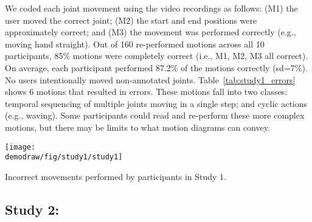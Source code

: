 We coded each joint movement using the video recordings as follows: (M1) the user moved the correct joint; (M2) the start and end positions were approximately correct; %
 and (M3) the movement was performed correctly (e.g., moving hand straight).
%
Out of 160 re-performed motions across all 10 participants, 85\% motions were completely correct (i.e., M1, M2, M3 all correct). On average, each participant performed 87.2\% of the motions correctly (sd=7\%). No users intentionally moved non-annotated joints.
Table~\ref{tab:study1_errors} shows 6 motions that resulted in errors. These motions fall into two classes: temporal sequencing of multiple joints moving in a single step; and cyclic actions (e.g., waving).
%
Some participants could read and re-perform these more complex motions, but there may be limits to what motion diagrams can convey.
%


\begin{table}
  \centering
  \texttt{[image: \\demodraw/fig/study1/study1]}
  \caption{Incorrect movements performed by participants in Study 1.}
  \label{tab:study1_errors}
\end{table}


\subsection{Study 2: \phaseI{}}

